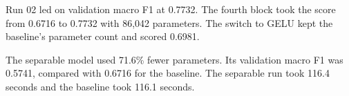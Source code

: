 Run 02 led on validation macro F1 at 0.7732. The fourth block took the score from 0.6716 to 0.7732 with 86,042 parameters. The switch to GELU kept the baseline's parameter count and scored 0.6981.

The separable model used 71.6\% fewer parameters. Its validation macro F1 was 0.5741, compared with 0.6716 for the baseline. The separable run took 116.4 seconds and the baseline took 116.1 seconds.

